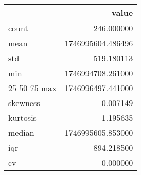 \begin{tabular}{lr}
\toprule
 & value \\
\midrule
count & 246.000000 \\
mean & 1746995604.486496 \\
std & 519.180113 \\
min & 1746994708.261000 \\
25%
50%
75%
max & 1746996497.441000 \\
skewness & -0.007149 \\
kurtosis & -1.195635 \\
median & 1746995605.853000 \\
iqr & 894.218500 \\
cv & 0.000000 \\
\bottomrule
\end{tabular}
